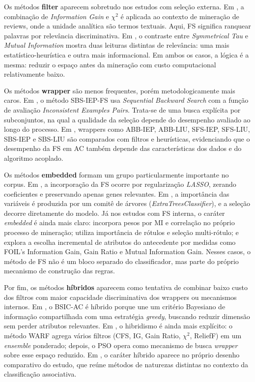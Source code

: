 Os métodos \textbf{filter} aparecem sobretudo nos estudos com seleção externa. Em \cite{alhawari2021classification}, a combinação de \textit{Information Gain} e $\chi^2$ é aplicada ao contexto de mineração de reviews, onde a unidade analítica são termos textuais. Aqui, FS significa ranquear palavras por relevância discriminativa. Em \cite{shaharanee2015irrelevant}, o contraste entre \textit{Symmetrical Tau} e \textit{Mutual Information} mostra duas leituras distintas de relevância: uma mais estatístico-heurística e outra mais informacional. Em ambos os casos, a lógica é a mesma: reduzir o espaço antes da mineração com custo computacional relativamente baixo.

Os métodos \textbf{wrapper} são menos frequentes, porém metodologicamente mais caros. Em \cite{ashi2021enhancing}, o método SBS-IEP-FS usa \textit{Sequential Backward Search} com a função de avaliação \textit{Inconsistent Examples Pairs}. Trata-se de uma busca explícita por subconjuntos, na qual a qualidade da seleção depende do desempenho avaliado ao longo do processo. Em \cite{alazaidah2021feature}, wrappers como ABB-IEP, ABB-LIU, SFS-IEP, SFS-LIU, SBS-IEP e SBS-LIU são comparados com filtros e heurísticas, evidenciando que o desempenho da FS em AC também depende das características dos dados e do algoritmo acoplado.

Os métodos \textbf{embedded} formam um grupo particularmente importante no corpus. Em \cite{cicek2021assessment}, a incorporação da FS ocorre por regularização \textit{LASSO}, zerando coeficientes e preservando apenas genes relevantes. Em \cite{piri2019exploring}, a importância das variáveis é produzida por um comitê de árvores (\textit{ExtraTreesClassifier}), e a seleção decorre diretamente do modelo. Já nos estudos com FS interna, o caráter \textit{embedded} é ainda mais claro: \cite{wu2024novel} incorpora pesos por MI e correlação no próprio processo de mineração; \cite{hou2025improved} utiliza importância de rótulos e seleção multi-rótulo; e \cite{nandhini2020performance} explora a escolha incremental de atributos do antecedente por medidas como FOIL’s Information Gain, Gain Ratio e Mutual Information Gain. Nesses casos, o método de FS não é um bloco separado do classificador, mas parte do próprio mecanismo de construção das regras.

Por fim, os métodos \textbf{híbridos} aparecem como tentativa de combinar baixo custo dos filtros com maior capacidade discriminativa dos wrappers ou mecanismos internos. Em \cite{gayathri2015efficient}, o BSIC-AC é híbrido porque une um critério Bayesiano de informação compartilhada com uma estratégia \textit{greedy}, buscando reduzir dimensão sem perder atributos relevantes. Em \cite{sowan2023hybrid}, o hibridismo é ainda mais explícito: o método WARF agrega vários filtros (CFS, IG, Gain Ratio, $\chi^2$, ReliefF) em um \textit{ensemble} ponderado; depois, o PSO opera como mecanismo de busca \textit{wrapper} sobre esse espaço reduzido. Em \cite{alazaidah2021feature}, o caráter híbrido aparece no próprio desenho comparativo do estudo, que reúne métodos de naturezas distintas no contexto da classificação associativa.


